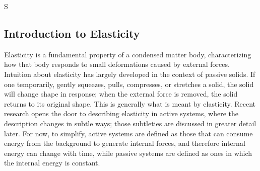  { S }
  {%
  }

\newcommand{\drawRectangle}[5]{%
    \draw[fill=#5, draw=#4] #1 rectangle #2; %
}

\newcommand{\drawRod}[5]{%
    \drawRectangle{#1}{#2}{#3}{#4}{#5}; %
    \foreach \x/\label in {0.9/$\vec{x}_1$, 1.9/$\vec{x}_2$, 2.9/$\vec{x}_3$, 3.9/$\vec{x}_4$, 4.9/$\vec{x}_5$} {%
        \draw[blue, fill=blue!20] (\x,#3) circle(0.1) node[anchor=south] {\scriptsize \label}; %
    }
}

\newcommand{\drawHashWall}[5]{%
    \begin{scope}
        \clip (#1,#2) rectangle (#3,#4); %
        \draw[fill=black,draw=black] (#3+#5,#2) rectangle (#3,#4);          %
        \pgfmathparse{#1+0.1}\let\secondvalue\pgfmathresult
        \pgfmathparse{#2-#4}\let\height\pgfmathresult
        \pgfmathparse{#3+\height}\let\thirdvalue\pgfmathresult
        \foreach \x in {#1,\secondvalue,...,\thirdvalue} {%
            \draw (\x,#2) -- +(-\height,-\height); %
        }
    \end{scope}
}

\subsection{Introduction to Elasticity}

Elasticity is a fundamental property of a condensed matter body, characterizing how that body responds to small deformations caused by external forces. Intuition about elasticity has largely developed in the context of passive solids. If one temporarily, gently squeezes, pulls, compresses, or stretches a solid, the solid will change shape in response; when the external force is removed, the solid returns to its original shape. This is generally what is meant by elasticity. Recent research opens the door to describing elasticity in active systems, where the description changes in subtle ways; those subtleties are discussed in greater detail later. For now, to simplify, active systems are defined as those that can consume energy from the background to generate internal forces, and therefore internal energy can change with time, while passive systems are defined as ones in which the internal energy is constant.

